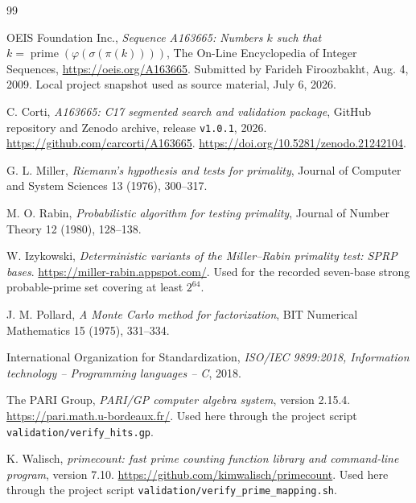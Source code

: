 \documentclass[11pt]{article}
\theoremstyle{definition}
\theoremstyle{remark}
\begin{document}
\begin{thebibliography}{99}
\sloppy
\raggedright

OEIS Foundation Inc.,
\emph{Sequence A163665: Numbers \(k\) such that
\(k=\operatorname{prime}(\varphi(\sigma(\pi(k))))\)},
The On-Line Encyclopedia of Integer Sequences,
\url{https://oeis.org/A163665}.
Submitted by Farideh Firoozbakht, Aug. 4, 2009.  Local project snapshot
used as source material, July 6, 2026.

C. Corti,
\emph{A163665: C17 segmented search and validation package},
GitHub repository and Zenodo archive, release \texttt{v1.0.1}, 2026.
\url{https://github.com/carcorti/A163665}.
\url{https://doi.org/10.5281/zenodo.21242104}.

G. L. Miller,
\emph{Riemann's hypothesis and tests for primality},
Journal of Computer and System Sciences 13 (1976), 300--317.

M. O. Rabin,
\emph{Probabilistic algorithm for testing primality},
Journal of Number Theory 12 (1980), 128--138.

W. Izykowski,
\emph{Deterministic variants of the Miller--Rabin primality test:
SPRP bases}.
\url{https://miller-rabin.appspot.com/}.
Used for the recorded seven-base strong probable-prime set covering at
least \(2^{64}\).

J. M. Pollard,
\emph{A Monte Carlo method for factorization},
BIT Numerical Mathematics 15 (1975), 331--334.

International Organization for Standardization,
\emph{ISO/IEC 9899:2018, Information technology -- Programming languages -- C},
2018.

The PARI Group,
\emph{PARI/GP computer algebra system}, version 2.15.4.
\url{https://pari.math.u-bordeaux.fr/}.
Used here through the project script
\texttt{validation/verify\_hits.gp}.

K. Walisch,
\emph{primecount: fast prime counting function library and command-line
program}, version 7.10.
\url{https://github.com/kimwalisch/primecount}.
Used here through the project script
\texttt{validation/verify\_prime\_mapping.sh}.

\end{thebibliography}
\end{document}
